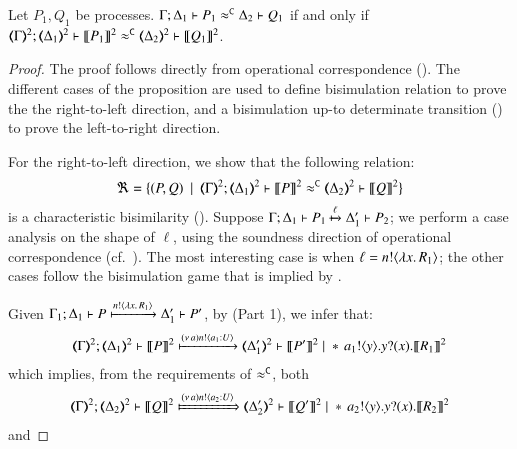 \begin{proposition}\myrm
	\label{app:prop:fulla_HOp_to_p}
	Let $P_1, Q_1$ be \HOp processes.
	$\Gamma; \Delta_1 \vdash P_1 \approx^\mathtt{C} \Delta_2 \vdash Q_1$
	if and only if
	$\horel{\tmap{\Gamma}{2}}{\tmap{\Delta_1}{2}}{\pmap{P_1}{2}}{\fwb}{\tmap{\Delta_2}{2}}{\pmap{Q_1}{2}}$.
\end{proposition}

\begin{proof}

%
	The proof follows directly from operational correspondence ().
	The different cases of the proposition are used to define
	bisimulation relation to prove the the right-to-left direction, and
	a bisimulation up-to determinate transition
	()
	to prove the
	left-to-right direction.

\bigskip

	\noi For the right-to-left direction, we show that the following relation:
	\[
		\Re = \set{
		(P,Q)
		\setbar \horel{\mapt{\Gamma}^{2}}{\mapt{\Delta_1}^2}{\pmap{P}{2}}{\fwb}{\mapt{\Delta_2}^2}{\pmap{Q}{2}}}
	\]
%
is a characteristic bisimilarity ().
%
Suppose $\Gamma; \Delta_1 \vdash P_1 \xmapsto{\ell} \Delta_1' \vdash P_2$; 
we perform a case analysis on the shape of ${\ell}$, using 
the soundness direction of operational correspondence (cf.~).
		The  most interesting case is when $\ell = n ! \langle \lambda x.\,R_1 \rangle$; the other cases follow
	the bisimulation game that is implied by .

	\noi Given $\Gamma_1; \Delta_1 \vdash P \xmapsto{n !\langle \lambda x.\,R_1 \rangle} \Delta_1' \vdash P'$, by 
 (Part 1), we  infer that:
%
	\begin{eqnarray*}
		\mapt{\Gamma}^{2}; \mapt{\Delta_1}^{2} \proves \pmap{P}{2} \hby{\news{a} \bactout{n}{a_1: U}} \mapt{\Delta_1'}^{2} \proves \pmap{P'}{2} \Par \repl \bout{a_1}{y} \binp{y}{x} \pmap{R_1}{2}
	\end{eqnarray*}
%
	which implies, from the requirements of $\approx^\mathtt{C}$, both 
%
	\begin{eqnarray}
		\label{prop:fa_ho_sessp_1}
		\mapt{\Gamma}^{2}; \mapt{\Delta_2}^{2} \proves \pmap{Q}{2} \Hby{\news{a} \bactout{n}{a_2: U}} \mapt{\Delta_2'}^{2} \proves \pmap{Q'}{2} \Par \repl \bout{a_2}{y} \binp{y}{x} \pmap{R_2}{2}
	\end{eqnarray}
%
	and


\end{proof}
